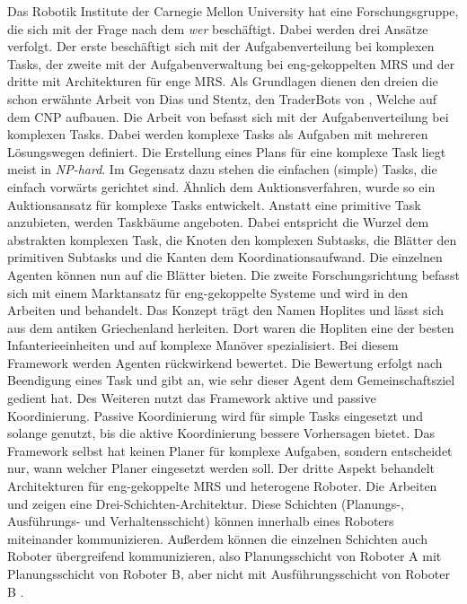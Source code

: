 Das Robotik Institute der Carnegie Mellon University hat eine Forschungsgruppe, die sich mit der Frage nach dem \textit{wer} beschäftigt. Dabei werden drei Ansätze verfolgt. Der erste beschäftigt sich mit der Aufgabenverteilung bei komplexen Tasks, der zweite mit der Aufgabenverwaltung bei eng-gekoppelten MRS und der dritte mit Architekturen für enge MRS. Als Grundlagen dienen den dreien die schon erwähnte Arbeit von Dias und Stentz, den TraderBots von \cite{dias2000market}, Welche auf dem CNP aufbauen. Die Arbeit von  \cite{zlot2005complex} befasst sich mit der Aufgabenverteilung bei komplexen Tasks. Dabei werden komplexe Tasks als Aufgaben mit mehreren Lösungswegen definiert. Die Erstellung eines Plans für eine komplexe Task liegt meist in \textit{NP-hard}. Im Gegensatz dazu stehen die einfachen (simple) Tasks, die einfach vorwärts gerichtet sind. Ähnlich dem Auktionsverfahren, wurde so ein Auktionsansatz für komplexe Tasks entwickelt. Anstatt eine primitive Task anzubieten, werden Taskbäume angeboten. Dabei entspricht die Wurzel dem abstrakten komplexen Task, die Knoten den komplexen Subtasks, die Blätter den primitiven Subtasks und die Kanten dem Koordinationsaufwand. Die einzelnen Agenten können nun auf die Blätter bieten. Die zweite Forschungsrichtung befasst sich mit einem Marktansatz für eng-gekoppelte Systeme und wird in den Arbeiten \cite{kalra2004hoplites} und \cite{kalra2005hoplites} behandelt. Das Konzept trägt den Namen Hoplites und lässt sich aus dem antiken Griechenland herleiten. Dort waren die Hopliten eine der besten Infanterieeinheiten und auf komplexe Manöver spezialisiert. Bei diesem Framework werden Agenten rückwirkend bewertet. Die Bewertung erfolgt nach Beendigung eines Task und gibt an, wie sehr dieser Agent dem Gemeinschaftsziel gedient hat. Des Weiteren nutzt das Framework aktive und passive Koordinierung. Passive Koordinierung wird für simple Tasks eingesetzt und solange genutzt, bis die aktive Koordinierung bessere Vorhersagen bietet. Das Framework selbst hat keinen Planer für komplexe Aufgaben, sondern entscheidet nur, wann welcher Planer eingesetzt werden soll. Der dritte Aspekt behandelt Architekturen für eng-gekoppelte MRS und heterogene Roboter. Die Arbeiten \cite{simmons2001first} und \cite{simmons2002layered} zeigen eine Drei-Schichten-Architektur. Diese Schichten (Planungs-, Ausführungs- und Verhaltensschicht) können innerhalb eines Roboters miteinander kommunizieren. Außerdem können die einzelnen Schichten auch Roboter übergreifend kommunizieren, also Planungsschicht von Roboter A mit Planungsschicht von Roboter B, aber nicht mit Ausführungsschicht von Roboter B \citep{lundh2006plan}.

